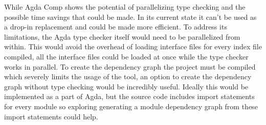 While Agda Comp shows the potential of parallelizing type checking and the
possible time savings that could be made. In its current state it can't be used
as a drop-in replacement and could be made more efficient. To address its
limitations, the Agda type checker itself would need to be parallelized from
within. This would avoid the overhead of loading interface files for every
index file compiled, all the interface files could be loaded at once while the
type checker works in parallel. To create the dependency graph the project must
be compiled which severely limits the usage of the tool, an option to create
the dependency graph without type checking would be incredibly useful. Ideally
this would be implemented as a part of Agda, but the source code includes
import statements for every module so exploring generating a module dependency
graph from these import statements could help.

%
